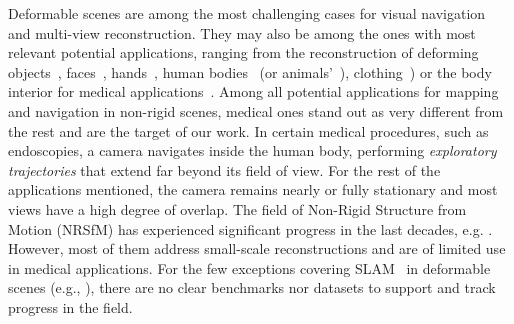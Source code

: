 \documentclass{article}
\begin{document}
Deformable scenes are among the most challenging cases for visual navigation and multi-view reconstruction. They may also be among the ones with most relevant potential applications, ranging from the reconstruction of deforming objects~\cite{badias2021morph}, faces~\cite{li2021topologically}, hands~\cite{qian2020html}, human bodies~\cite{wang2021deep} (or animals'~\cite{li2021coarse}), clothing~\cite{su2020mulaycap}) or the body interior for medical applications~\cite{lamarca2020defslam,sengupta2021colonoscopic,recasens2021endo,shao2022self}.
Among all potential applications for mapping and navigation in non-rigid scenes, medical ones stand out as very different from the rest and are the target of our work. In certain medical procedures, such as endoscopies, a camera navigates inside the human body, performing \emph{exploratory trajectories} that extend far beyond its field of view. For the rest of the applications mentioned, the camera remains nearly or fully stationary and most views have a high degree of overlap. The field of Non-Rigid Structure from Motion (NRSfM) has experienced significant progress in the last decades, 
e.g. \cite{rabaud2008re,gotardo2011non,lee2013procrustean,garg2013dense,dai2014simple,agudo2014good,kong2019deep,bozic2020deepdeform,yang2021lasr,tretschk2021non,pumarola2021d,potje2021extracting,parashar2021robust,weng2022humannerf}. However, most of them address small-scale reconstructions and are of limited use in medical applications. For the few exceptions covering SLAM~\cite{cadena2016past} in deformable scenes (e.g., \cite{lamarca2020defslam,sengupta2021colonoscopic,shao2022self,gomez2021sd}), there are no clear benchmarks nor datasets to support and track progress in the field.
\end{document}
